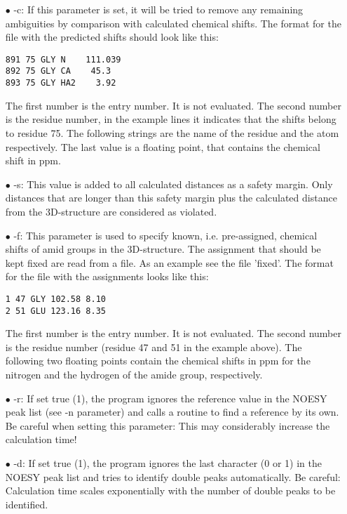 \documentclass{scrartcl}
\begin{document}
\begin{itemize}
\item[$\bullet$] -c: If this parameter is set, it will be tried to remove any remaining ambiguities by comparison with calculated chemical shifts. The format for the file with the predicted shifts should look like this:
\begin{verbatim}
891 75 GLY N    111.039 
892 75 GLY CA    45.3
893 75 GLY HA2    3.92  
\end{verbatim}
The first number is the entry number. It is not evaluated. The second number is the residue number, in the example lines it indicates that the shifts belong to residue 75. The following strings are the name of the residue and the atom respectively.
The last value is a floating point, that contains the chemical shift in ppm.

\item[$\bullet$] -s: This value is added to all calculated distances as a safety margin. Only distances that are longer than this safety margin plus the calculated distance from the 3D-structure are considered as violated.

\item[$\bullet$] -f: This parameter is used to specify known, i.e. pre-assigned, chemical shifts of amid groups in the 3D-structure. The assignment that should be kept fixed are read from a file. 
As an example see the file 'fixed'. The format for the file with the assignments looks like this:
\begin{verbatim}
1 47 GLY 102.58 8.10 
2 51 GLU 123.16 8.35
\end{verbatim}
The first number is the entry number. It is not evaluated. The second number is the residue number (residue 47 and 51 in the example above). 
The following two floating points contain the chemical shifts in ppm for the nitrogen and the hydrogen of the amide group, respectively.

\item[$\bullet$] -r: If set true (1), the program ignores the reference value in the NOESY peak list (see -n parameter) and calls a routine to find a reference by its own. Be careful when setting this parameter: This may considerably increase the calculation time!

\item[$\bullet$] -d: If set true (1), the program ignores the last character (0 or 1)  in the NOESY peak list and tries to identify double peaks automatically. Be careful: Calculation time scales exponentially with the number of double peaks to be identified.
\end{itemize}
\end{document}
